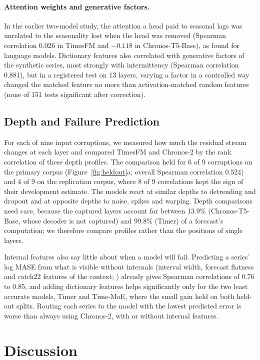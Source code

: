 \documentclass[twoside,11pt]{article}
\begin{document}
\paragraph{Attention weights and generative factors.}
In the earlier two-model study, the attention a head paid to seasonal lags was unrelated to the seasonality lost when the head was removed (Spearman correlation 0.026 in TimesFM and $-0.118$ in Chronos-T5-Base), as \citet{jain2019attention} found for language models.
Dictionary features also correlated with generative factors of the synthetic series, most strongly with intermittency (Spearman correlation 0.881), but in a registered test on 13 layers, varying a factor in a controlled way changed the matched feature no more than activation-matched random features (none of 151 tests significant after correction).

\subsection{Depth and Failure Prediction}
\label{sec:depth}

For each of nine input corruptions, we measured how much the residual stream changes at each layer and compared TimesFM and Chronos-2 by the rank correlation of these depth profiles.
The comparison held for 6 of 9 corruptions on the primary corpus (Figure~\ref{fig:heldout}a; overall Spearman correlation 0.524) and 4 of 9 on the replication corpus, where 8 of 9 correlations kept the sign of their development estimate.
The models react at similar depths to detrending and dropout and at opposite depths to noise, spikes and warping.
Depth comparisons need care, because the captured layers account for between 13.9\% (Chronos-T5-Base, whose decoder is not captured) and 99.8\% (Timer) of a forecast's computation; we therefore compare profiles rather than the positions of single layers.

Internal features also say little about when a model will fail. Predicting a series' log MASE from what is visible without internals (interval width, forecast flatness and catch22 features of the context; \citealp{lubba2019catch22}) already gives Spearman correlations of 0.76 to 0.85, and adding dictionary features helps significantly only for the two least accurate models, Timer and Time-MoE, where the small gain held on both held-out splits.
Routing each series to the model with the lowest predicted error is worse than always using Chronos-2, with or without internal features.

\section{Discussion}
\label{sec:discussion}
\end{document}
